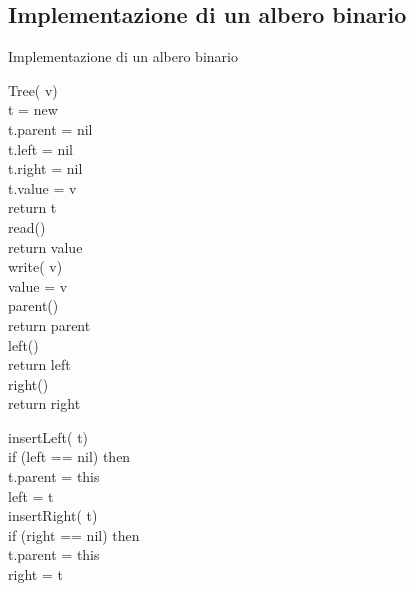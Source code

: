 \subsection{Implementazione di un albero binario}
\begin{code}{Implementazione di un albero binario}
    \begin{minipage}[t]{0.48\textwidth}
        \ind Tree( v)\\
             t = new \\
            t.parent = nil\\
            t.left = nil\\
            t.right = nil\\
            t.value = v\\
            return t\\
        
        \ind{} read()\\
            return value\\

        \ind write( v)\\
            value = v\\

        \ind{} parent()\\
            return parent\\

        \ind{} left()\\
            return left\\

        \ind{} right()\\
            return right\\
    \end{minipage}
    \hfill
    \begin{minipage}[t]{0.48\textwidth}
        \rmbreak\ind insertLeft( t)\\
            \indf if (left == nil) then\\
                t.parent = this\\
                left = t\\

        \ind insertRight( t)\\
            \indf if (right == nil) then\\
                t.parent = this\\
                right = t\\


\end{minipage}
\end{code}
